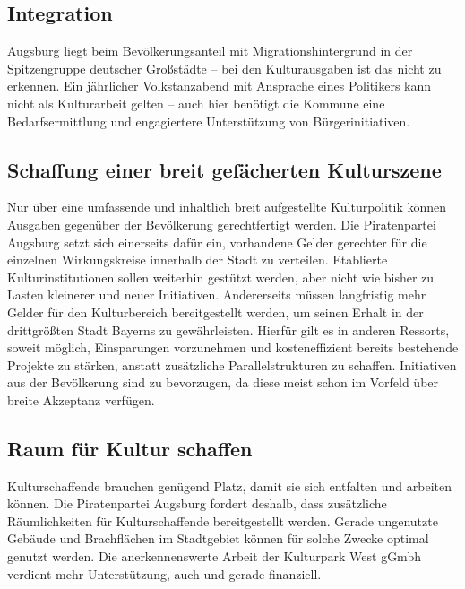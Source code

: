 \documentclass[a5paper, twoside, ngerman, 10pt]{scrbook}
\begin{document}
   \subsection{Integration}
   
   Augsburg liegt beim Bevölkerungsanteil mit Migrationshintergrund in der 
   Spitzengruppe deutscher Großstädte – bei den Kulturausgaben ist das nicht 
   zu erkennen. Ein jährlicher Volkstanzabend mit Ansprache eines Politikers 
   kann nicht als Kulturarbeit gelten – auch hier benötigt die Kommune eine 
   Bedarfsermittlung und engagiertere Unterstützung von Bürgerinitiativen.
   
   \subsection{Schaffung einer breit gefächerten Kulturszene}
   
   Nur über eine umfassende und inhaltlich breit aufgestellte Kulturpolitik 
   können Ausgaben gegenüber der Bevölkerung gerechtfertigt werden. Die 
   Piratenpartei Augsburg setzt sich einerseits dafür ein, vorhandene Gelder 
   gerechter für die einzelnen Wirkungskreise innerhalb der Stadt zu 
   verteilen. Etablierte Kulturinstitutionen sollen weiterhin gestützt werden, 
   aber nicht wie bisher zu Lasten kleinerer und neuer Initiativen. 
   Andererseits müssen langfristig mehr Gelder für den Kulturbereich 
   bereitgestellt werden, um seinen Erhalt in der drittgrößten Stadt Bayerns 
   zu gewährleisten. Hierfür gilt es in anderen Ressorts, soweit möglich, 
   Einsparungen vorzunehmen und kosteneffizient bereits bestehende Projekte zu 
   stärken, anstatt zusätzliche Parallelstrukturen zu schaffen. Initiativen 
   aus der Bevölkerung sind zu bevorzugen, da diese meist schon im Vorfeld 
   über breite Akzeptanz verfügen.
   
   \subsection{Raum für Kultur schaffen}
   
   Kulturschaffende brauchen genügend Platz, damit sie sich entfalten und 
   arbeiten können. Die Piratenpartei Augsburg fordert deshalb, dass 
   zusätzliche Räumlichkeiten für Kulturschaffende bereitgestellt werden. 
   Gerade ungenutzte Gebäude und Brachflächen im Stadtgebiet können für solche 
   Zwecke optimal genutzt werden. Die anerkennenswerte Arbeit der Kulturpark 
   West gGmbh verdient mehr Unterstützung, auch und gerade finanziell.
   
\end{document}
